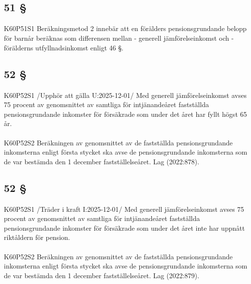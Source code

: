 \documentclass[a4paper,notitlepage,openany,10pt]{book}
\begin{document}
\subsection*{51 §}
\paragraph*{}
{\tiny K60P51S1}
Beräkningsmetod 2 innebär att en förälders pensionsgrundande belopp för barnår beräknas som differensen mellan
\newline - generell jämförelseinkomst och
\newline - förälderns utfyllnadsinkomst enligt 46 §.
\subsection*{52 §}
\paragraph*{}
{\tiny K60P52S1}
/Upphör att gälla U:2025-12-01/
Med generell jämförelseinkomst avses 75 procent av genomsnittet av samtliga för intjänandeåret fastställda pensionsgrundande inkomster för försäkrade som under det året har fyllt högst 65 år.
\paragraph*{}
{\tiny K60P52S2}
Beräkningen av genomsnittet av de fastställda pensionsgrundande inkomsterna enligt första stycket ska avse de pensionsgrundande inkomsterna som de var bestämda den 1 december fastställelseåret.
Lag (2022:878).
\subsection*{52 §}
\paragraph*{}
{\tiny K60P52S1}
/Träder i kraft I:2025-12-01/
Med generell jämförelseinkomst avses 75 procent av genomsnittet av samtliga för intjänandeåret fastställda pensionsgrundande inkomster för försäkrade som under det året inte har uppnått riktåldern för pension.
\paragraph*{}
{\tiny K60P52S2}
Beräkningen av genomsnittet av de fastställda pensionsgrundande inkomsterna enligt första stycket ska avse de pensionsgrundande inkomsterna som de var bestämda den 1 december fastställelseåret.
Lag (2022:879).
\end{document}
